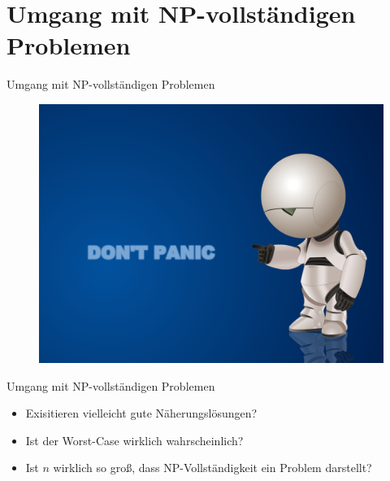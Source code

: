 \documentclass[ignorenonframetext,]{beamer}
\begin{document}
\section[Umgang]{Umgang mit NP-vollständigen Problemen}

\begin{frame}{Umgang mit NP-vollständigen Problemen}

\begin{figure}[htbp]
\centering
\includegraphics{img/dont_panic.png}
\end{figure}

\end{frame}

\begin{frame}{Umgang mit NP-vollständigen Problemen}

\begin{itemize}
\itemsep1pt\parskip0pt
\item
  Exisitieren vielleicht gute Näherungslösungen?
\item
  Ist der Worst-Case wirklich wahrscheinlich?
\item
  Ist $n$ wirklich so groß, dass NP-Vollständigkeit ein Problem
  darstellt?
\end{itemize}

\end{frame}
\end{document}
